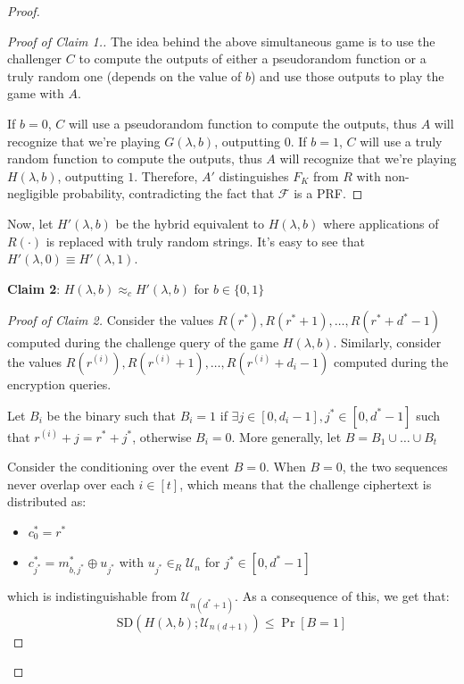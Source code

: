 \documentclass[a4paper, 12pt]{report}
\begin{document}
\begin{proof}
\begin{proof}[Proof of Claim 1.]
            The idea behind the above simultaneous game is to use the challenger $C$ to compute the outputs of either a pseudorandom function or a truly random one (depends on the value of $b$) and use those outputs to play the game with $A$.
            
            If $b = 0$, $C$ will use a pseudorandom function to compute the outputs, thus $A$ will recognize that we're playing $G(\lambda, b)$, outputting $0$. If $b = 1$, $C$ will use a truly random function to compute the outputs, thus $A$ will recognize that we're playing $H(\lambda, b)$, outputting $1$. Therefore, $A'$ distinguishes $F_K$ from $R$ with non-negligible probability, contradicting the fact that $\mathcal{F}$ is a PRF.
        \end{proof}

        Now, let $H'(\lambda, b)$ be the hybrid equivalent to $H(\lambda, b)$ where applications of $R(\cdot)$ is replaced with truly random strings. It's easy to see that $H'(\lambda, 0) \equiv H'(\lambda, 1)$.

        \textbf{Claim 2}: $H(\lambda, b) \approx_c H'(\lambda,b)$ for $b \in \{0,1\}$

        \begin{proof}[Proof of Claim 2]
            Consider the values $R(r^*), R(r^*+1), \ldots, R(r^*+d^*-1)$ computed during the challenge query of the game $H(\lambda, b)$. Similarly, consider the values $R(r^{(i)}), R(r^{(i)}+1), \ldots, R(r^{(i)}+d_i-1)$ computed during the encryption queries.

            Let $B_i$ be the binary  such that $B_i = 1$ if $\exists j \in [0,d_i-1], j^* \in [0, d^*-1]$ such that $r^{(i)} + j = r^* + j^*$, otherwise $B_i = 0$. More generally, let $B = B_1 \cup \ldots \cup B_t$

            Consider the conditioning over the event $B = 0$. When $B = 0$, the two sequences never overlap over each $i \in [t]$, which means that the challenge ciphertext is distributed as:
            \begin{itemize}
                \item $c^*_0 = r^*$
                \item $c^*_{j^*} = m^*_{b,{j^*}} \oplus u_{j^*}$ with $u_{j^*} \in_R \mathcal{U}_n$ for $j^* \in [0,d^*-1]$
            \end{itemize}

            which is indistinguishable from $\mathcal{U}_{n(d^*+1)}$. As a consequence of this, we get that:
            \[\mathrm{SD}(H(\lambda, b); \mathcal{U}_{n(d+1)}) \leq \Pr[B = 1]\]


\end{proof}
\end{proof}
\end{document}
